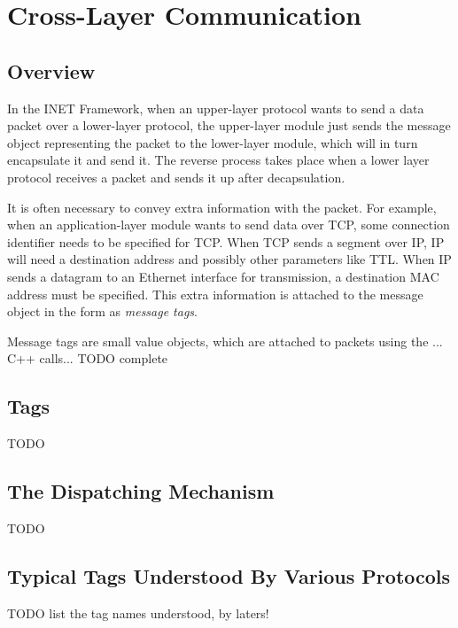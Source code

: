\chapter{Cross-Layer Communication}
\label{cha:cross-layer-communication}

\section{Overview}

In the INET Framework, when an upper-layer protocol wants to send a data
packet over a lower-layer protocol, the upper-layer module just sends the
message object representing the packet to the lower-layer module, which
will in turn encapsulate it and send it. The reverse process takes place
when a lower layer protocol receives a packet and sends it up after
decapsulation.

It is often necessary to convey extra information with the packet. For
example, when an application-layer module wants to send data over TCP, some
connection identifier needs to be specified for TCP. When TCP sends a
segment over IP, IP will need a destination address and possibly other
parameters like TTL. When IP sends a datagram to an Ethernet interface for
transmission, a destination MAC address must be specified. This extra
information is attached to the message object in the form as \textit{message tags}.

Message tags are small value objects, which are attached to packets using
the ... C++ calls...  TODO complete



\section{Tags}

TODO

\section{The Dispatching Mechanism}

TODO

\section{Typical Tags Understood By Various Protocols}

TODO list the tag names understood, by laters!



